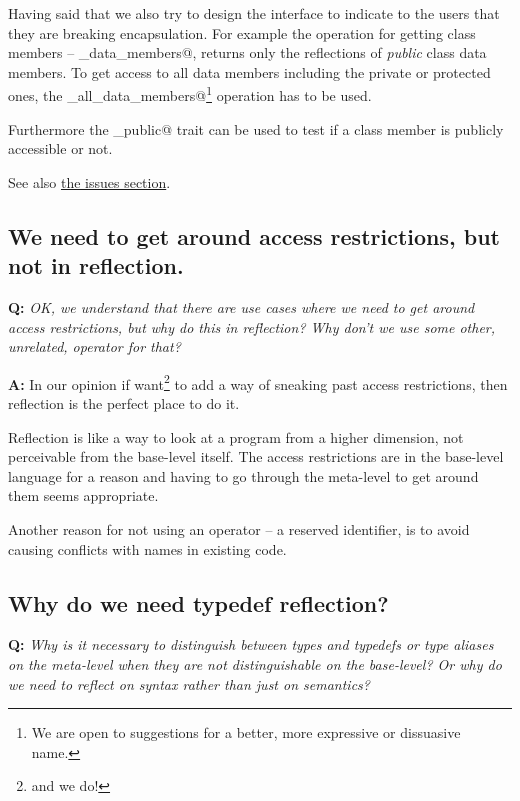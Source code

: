 Having said that we also try to design the interface to indicate to the users
that they are breaking encapsulation. For example the  operation
for getting class members -- \verb@get_data_members@, returns only the
reflections of {\em public} class data members. To get access to all data members
including the private or protected ones, the \verb@get_all_data_members@\footnote
{We are open to suggestions for a better, more expressive or dissuasive name.}
operation has to be used.

Furthermore the \verb@is_public@ trait can be used to test if a class member
is publicly accessible or not.

See also \hyperref[issue-breaking-access]{the issues section}.

\subsection{We need to get around access restrictions, but not in reflection.}

\textbf{Q:} {\em OK, we understand that there are use cases where we need
to get around access restrictions, but why do this in reflection?
Why don't we use some other, unrelated,  operator for that?}

\textbf{A:}
In our opinion if want\footnote{and we do!} to add a way of sneaking past
access restrictions, then reflection is the perfect place to do it.

Reflection is like a way to look at a program from a higher dimension,
not perceivable from the base-level itself. The access restrictions are in
the base-level language for a reason and having to go through the meta-level
to get around them seems appropriate.

Another reason for not using an operator -- a reserved identifier, is to avoid
causing conflicts with names in existing code.

\subsection{Why do we need typedef reflection?}

\textbf{Q:} {\em Why is it necessary to distinguish between types and typedefs
or type aliases on the meta-level when they are not distinguishable on the
base-level? Or why do we need to reflect on syntax rather than just on semantics?}

